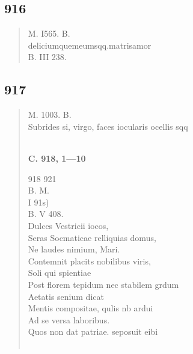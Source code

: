 \documentclass[11pt, a4paper]{report}
\begin{document}
            \subsection*{916}
      \begin{verse}
      M. I565. B. \\ deliciumquemeumsqq.matrisamor \\ B. III 238. \\ 
      \end{verse}
  
            \subsection*{917}
      \begin{verse}
      M. 1003. B. \\ Subrides si, virgo, faces iocularis ocellis sqq \\ 
        ﻿\pagebreak 
    \begin{center} \textbf{C. 918, 1—10} \end{center} \marginpar{[344]} 918 921 \\ B. M. \\ I 91s) \\ B. V 408. \\ Dulces Vestricii iocos, \\ Seras Socmaticae relliquias domus, \\ Ne laudes nimium, Mari. \\ Contemnit placits  \lbrack nobilibus viris, \\ Soli qui spientiae \\ Post florem tepidum nec stabilem grdum \\ Aetatis senium dicat \\ Mentis compositae, qulis nb ardui \\ Ad se versa laboribus. \\ Quos non dat patriae. seposuit eibi \\ 
        ﻿\pagebreak 

\end{verse}
\end{document}
